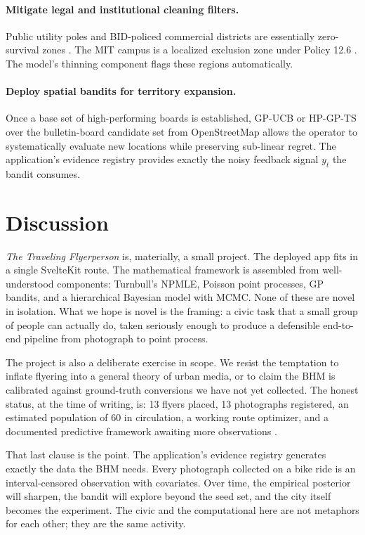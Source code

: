 \documentclass[sigconf,nonacm]{acmart}
\begin{document}
\paragraph{Mitigate legal and institutional cleaning filters.} Public utility poles and BID-policed commercial districts are essentially zero-survival zones \cite{cambridge-redditA, cambridge-redditB}. The MIT campus is a localized exclusion zone under Policy 12.6 \cite{mit-policy}. The model's thinning component flags these regions automatically.

\paragraph{Deploy spatial bandits for territory expansion.} Once a base set of high-performing boards is established, GP-UCB or HP-GP-TS over the bulletin-board candidate set from OpenStreetMap allows the operator to systematically evaluate new locations while preserving sub-linear regret. The application's evidence registry provides exactly the noisy feedback signal $y_t$ the bandit consumes.

\section{Discussion}
\label{sec:discussion}

\emph{The Traveling Flyerperson} is, materially, a small project. The deployed app fits in a single SvelteKit route. The mathematical framework is assembled from well-understood components: Turnbull's NPMLE, Poisson point processes, GP bandits, and a hierarchical Bayesian model with MCMC. None of these are novel in isolation. What we hope is novel is the framing: a civic task that a small group of people can actually do, taken seriously enough to produce a defensible end-to-end pipeline from photograph to point process.

The project is also a deliberate exercise in scope. We resist the temptation to inflate flyering into a general theory of urban media, or to claim the BHM is calibrated against ground-truth conversions we have not yet collected. The honest status, at the time of writing, is: 13 flyers placed, 13 photographs registered, an estimated population of 60 in circulation, a working route optimizer, and a documented predictive framework awaiting more observations \cite{cambridge-dev-org}.

That last clause is the point. The application's evidence registry generates exactly the data the BHM needs. Every photograph collected on a bike ride is an interval-censored observation with covariates. Over time, the empirical posterior will sharpen, the bandit will explore beyond the seed set, and the city itself becomes the experiment. The civic and the computational here are not metaphors for each other; they are the same activity.
\end{document}
